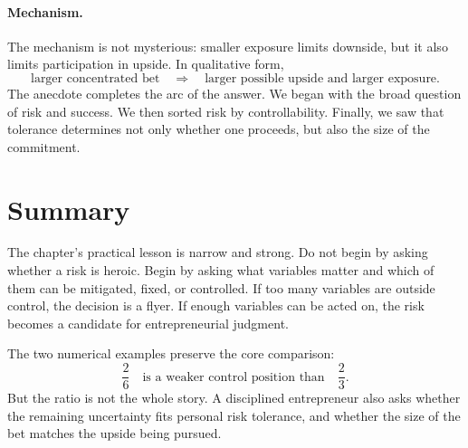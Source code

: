 \paragraph{Mechanism.}
The mechanism is not mysterious: smaller exposure limits downside, but it also limits participation in upside. In qualitative form,
\begin{equation}
\text{larger concentrated bet}
\quad \Longrightarrow \quad
\text{larger possible upside and larger exposure}.
\end{equation}
The anecdote completes the arc of the answer. We began with the broad question of risk and success. We then sorted risk by controllability. Finally, we saw that tolerance determines not only whether one proceeds, but also the size of the commitment.

\section{Summary}

The chapter's practical lesson is narrow and strong. Do not begin by asking whether a risk is heroic. Begin by asking what variables matter and which of them can be mitigated, fixed, or controlled. If too many variables are outside control, the decision is a flyer. If enough variables can be acted on, the risk becomes a candidate for entrepreneurial judgment.

The two numerical examples preserve the core comparison:
\begin{equation}
\frac{2}{6}
\quad \text{is a weaker control position than} \quad
\frac{2}{3}.
\end{equation}
But the ratio is not the whole story. A disciplined entrepreneur also asks whether the remaining uncertainty fits personal risk tolerance, and whether the size of the bet matches the upside being pursued.